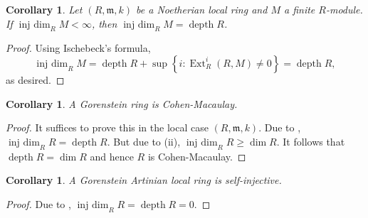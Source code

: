 \documentclass[10pt]{article}
\theoremstyle{thmstyle}
\theoremstyle{defstyle}
\newtheorem{corollary}[theorem]{Corollary}
\newcommand{\frakm}{\mathfrak{m}} %
\renewcommand{\ge}{\geqslant}
\newcommand{\Ext}{\operatorname{Ext}}
\newcommand{\injdim}{\operatorname{inj~dim}}
\newcommand{\depth}{\operatorname{depth}}
\begin{document}
\begin{corollary}
    Let $(R,\frakm,k)$ be a Noetherian local ring and $M$ a finite $R$-module. If $\injdim_R M < \infty$, then $\injdim_R M = \depth R$.
\end{corollary}
\begin{proof}
    Using Ischebeck's formula, 
    \begin{equation*}
        \injdim_R M = \depth R + \sup\left\{i\colon\Ext^i_R(R, M)\ne 0\right\} = \depth R,
    \end{equation*}
    as desired.
\end{proof}

\begin{corollary}
    A Gorenstein ring is Cohen-Macaulay.
\end{corollary}
\begin{proof}
    It suffices to prove this in the local case $(R,\frakm,k)$. Due to , $\injdim_R R = \depth R$. But due to  (ii), $\injdim_R R\ge\dim R$. It follows that $\depth R = \dim R$ and hence $R$ is Cohen-Macaulay.
\end{proof}

\begin{corollary}
    A Gorenstein Artinian local ring is self-injective.
\end{corollary}
\begin{proof}
    Due to , $\injdim_R R = \depth R = 0$.
\end{proof}
\end{document}
